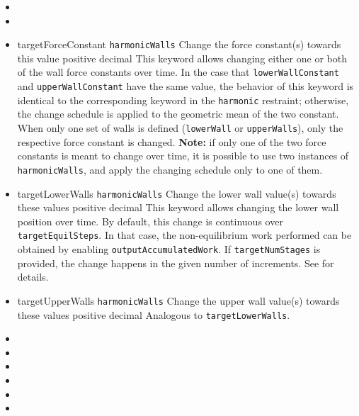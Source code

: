 \begin{itemize}
\item %

\item {}

\item %
  \key
    {targetForceConstant}{%
    \texttt{harmonicWalls}}{%
    Change the force constant(s) towards this value}{%
    positive decimal}{%
    This keyword allows changing either one or both of the wall force constants over time.
    In the case that \texttt{lowerWallConstant} and \texttt{upperWallConstant} have the same value, the behavior of this keyword is identical to the corresponding keyword in the \texttt{harmonic} restraint; otherwise, the change schedule is applied to the geometric mean of the two constant.
    When only one set of walls is defined (\texttt{lowerWall} or \texttt{upperWalls}), only the respective force constant is changed.
    \textbf{Note:} if only one of the two force constants is meant to change over time, it is possible to use two instances of \texttt{harmonicWalls}, and apply the changing schedule only to one of them.
  }

\item %
\key
  {targetLowerWalls}{%
  \texttt{harmonicWalls}}{%
  Change the lower wall value(s) towards these values}{%
  positive decimal}{%
  This keyword allows changing the lower wall position over time.
  By default, this change is continuous over \texttt{targetEquilSteps}. In that case, the non-equilibrium work performed can be obtained by enabling  \texttt{outputAccumulatedWork}.
  If \texttt{targetNumStages} is provided, the change happens in the given number of increments. See  for details.
}

\item %
\key
  {targetUpperWalls}{%
  \texttt{harmonicWalls}}{%
  Change the upper wall value(s) towards these values}{%
  positive decimal}{%
  Analogous to \texttt{targetLowerWalls}.
}

\item {}
\item {}
\item {}
\item {}
\item {}
\item {}


\end{itemize}
